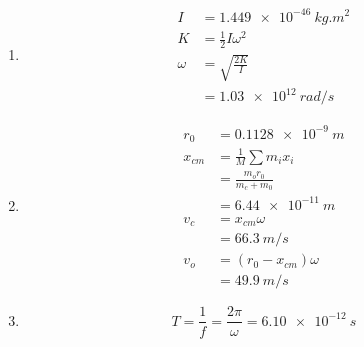 \documentclass{article}
\begin{document}
\begin{enumerate}
  \item

        \begin{align*}
          I      & = \qty{1.449e-46}{kg.m^2} \\
          K      & = \frac{1}{2} I \omega^2  \\
          \omega & = \sqrt{\frac{2 K}{I}}    \\
                 & = \qty{1.03e12}{rad/s}
        \end{align*}

  \item

        \begin{align*}
          r_0    & = \qty{0.1128e-9}{m}        \\
          x_{cm} & = \frac{1}{M} \sum m_i x_i  \\
                 & = \frac{m_o r_0}{m_c + m_0} \\
                 & = \qty{6.44e-11}{m}         \\
          v_c    & = x_{cm} \omega             \\
                 & = \qty{66.3}{m/s}           \\
          v_o    & = (r_0 - x_{cm}) \omega     \\
                 & = \qty{49.9}{m/s}
        \end{align*}

  \item \[T = \frac{1}{f} = \frac{2 \pi}{\omega} = \qty{6.10e-12}{s}\]
\end{enumerate}

\setcounter{subsubsection}{10}
\subsubsection{}
\end{document}
